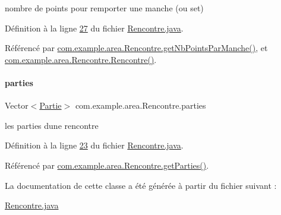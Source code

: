 nombre de points pour remporter une manche (ou set) 



Définition à la ligne \hyperlink{_rencontre_8java_source_l00027}{27} du fichier \hyperlink{_rencontre_8java_source}{Rencontre.\+java}.



Référencé par \hyperlink{_rencontre_8java_source_l00213}{com.\+example.\+area.\+Rencontre.\+get\+Nb\+Points\+Par\+Manche()}, et \hyperlink{_rencontre_8java_source_l00058}{com.\+example.\+area.\+Rencontre.\+Rencontre()}.

\mbox{\label{classcom_1_1example_1_1area_1_1_rencontre_a9bdc6df389184fc2ecb4d87a7879213a}} 
\paragraph{\texorpdfstring{parties}{parties}}
{\footnotesize\ttfamily Vector$<$\hyperlink{classcom_1_1example_1_1area_1_1_partie}{Partie}$>$ com.\+example.\+area.\+Rencontre.\+parties\hspace{0.3cm}{\ttfamily [private]}}



les parties d\textquotesingle{}une rencontre 



Définition à la ligne \hyperlink{_rencontre_8java_source_l00023}{23} du fichier \hyperlink{_rencontre_8java_source}{Rencontre.\+java}.



Référencé par \hyperlink{_rencontre_8java_source_l00158}{com.\+example.\+area.\+Rencontre.\+get\+Parties()}.



La documentation de cette classe a été générée à partir du fichier suivant \+:\begin{DoxyCompactItemize}
\item 
\hyperlink{_rencontre_8java}{Rencontre.\+java}\end{DoxyCompactItemize}
